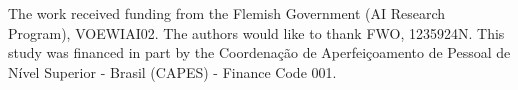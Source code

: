 \documentclass[sn-mathphys-num]{sn-jnl}%
\theoremstyle{thmstyleone}%
\theoremstyle{thmstyletwo}%
\theoremstyle{thmstylethree}%
\begin{document}
The work received funding from the Flemish Government (AI Research Program), VOEWIAI02. The authors would like to thank FWO, 1235924N. This study was financed in part by the Coordenação de
Aperfeiçoamento de Pessoal de Nível Superior - Brasil (CAPES) - Finance Code 001. 



\FloatBarrier


\end{document}
